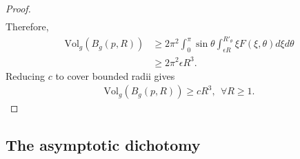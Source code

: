 \documentclass[letterpaper]{amsart}
\theoremstyle{definition}
\theoremstyle{remark}
\begin{document}
\begin{proof}
\begin{align*}
\end{align*} 
Therefore,
\begin{align*}
	\mathrm{Vol}_g(B_g(p,R) ) &\geq 2 \pi ^2 \int_{0}^{\pi } \sin \theta  \int_{\epsilon R} ^{R'_{\theta }} \xi F(\xi ,\theta ) d \xi d \theta \\
				  &\geq 2 \pi ^2 \epsilon R ^3.
\end{align*} 
Reducing $c$ to cover bounded radii gives
\begin{align*}
	\mathrm{Vol}_g(B_g(p,R) ) \geq c R^3,\ \ \forall R \geq 1.
\end{align*} 

\end{proof}

\subsection{The asymptotic dichotomy}\label{subsec-asymptotic}
\end{document}
